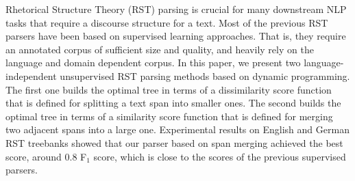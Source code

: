 Rhetorical Structure Theory (RST) parsing is crucial for many downstream NLP tasks that require a discourse structure for a text. Most of the previous RST parsers have been based on supervised learning approaches. That is, they require an annotated corpus of sufficient size and quality, and heavily rely on the language and domain dependent corpus. In this paper, we present two language-independent unsupervised RST parsing methods based on dynamic programming. The first one builds the optimal tree in terms of a dissimilarity score function that is defined for splitting a text span into smaller ones. The second builds the optimal tree in terms of a similarity score function that is defined for merging two adjacent spans into a large one. Experimental results on English and German RST treebanks showed that our parser based on span merging achieved the best score, around 0.8 F$_1$ score, which is close to the scores of the previous supervised parsers.